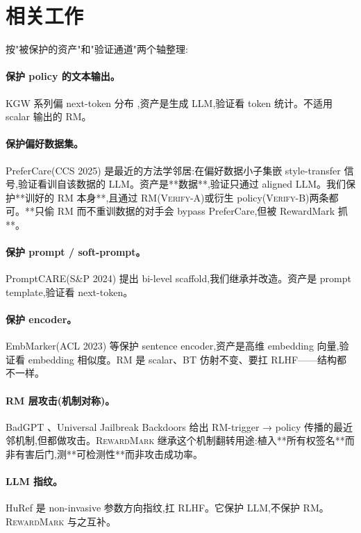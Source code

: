 \documentclass[11pt]{article}
\newcommand{\rewardmark}{\textsc{RewardMark}}
\newcommand{\verifya}{\textsc{Verify-A}}
\newcommand{\verifyb}{\textsc{Verify-B}}
\begin{document}
\section{相关工作}
\label{zh:related}

按"被保护的资产"和"验证通道"两个轴整理:

\paragraph{保护 policy 的文本输出。}KGW 系列偏 next-token 分布 \citep{kirchenbauer2023watermark,christ2023undetectable},资产是生成 LLM,验证看 token 统计。不适用 scalar 输出的 RM。

\paragraph{保护偏好数据集。}PreferCare(CCS 2025)\citep{lou2025prefercare} 是最近的方法学邻居:在偏好数据小子集嵌 style-transfer 信号,验证看训自该数据的 LLM。资产是**数据**,验证只通过 aligned LLM。我们保护**训好的 RM 本身**,且通过 RM(\verifya{})或衍生 policy(\verifyb{})两条都可。**只偷 RM 而不重训数据的对手会 bypass PreferCare,但被 RewardMark 抓**。

\paragraph{保护 prompt / soft-prompt。}PromptCARE(S\&P 2024)\citep{yao2024promptcare} 提出 bi-level scaffold,我们继承并改造。资产是 prompt template,验证看 next-token。

\paragraph{保护 encoder。}EmbMarker(ACL 2023)\citep{peng2023embmarker} 等保护 sentence encoder,资产是高维 embedding 向量,验证看 embedding 相似度。RM 是 scalar、BT 仿射不变、要扛 RLHF——结构都不一样。

\paragraph{RM 层攻击(机制对称)。}BadGPT \citep{shi2023badgpt}、Universal Jailbreak Backdoors \citep{rando2023universal} 给出 RM-trigger → policy 传播的最近邻机制,但都做攻击。\rewardmark{} 继承这个机制翻转用途:植入**所有权签名**而非有害后门,测**可检测性**而非攻击成功率。

\paragraph{LLM 指纹。}HuRef \citep{zeng2024huref} 是 non-invasive 参数方向指纹,扛 RLHF。它保护 LLM,不保护 RM。\rewardmark{} 与之互补。
\end{document}
